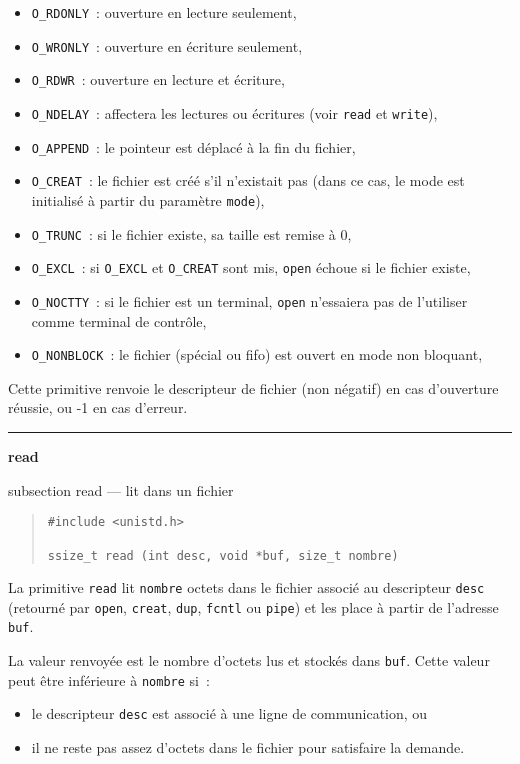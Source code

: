 \documentclass [twoside] {report}
\newcommand {\primitive} [1]
    {
	\phantomsection
	{\large \bf #1}
	\addcontentsline {toc} {subsection} {#1}
    }
\newcommand {\separation}
    {
	\vspace {5mm}
	\nopagebreak
	\hrule
    }
\begin{document}
\begin {itemize}
    \item {\tt O\_RDONLY}~: ouverture en lecture seulement,
    \item {\tt O\_WRONLY}~: ouverture en écriture seulement,
    \item {\tt O\_RDWR}~: ouverture en lecture et écriture,
    \item {\tt O\_NDELAY}~: affectera les lectures ou
	écritures (voir {\tt read} et {\tt write}),
    \item {\tt O\_APPEND}~: le pointeur est déplacé à la fin du fichier,
    \item {\tt O\_CREAT}~: le fichier est créé s'il n'existait pas
	(dans ce cas, le mode est initialisé à partir du paramètre {\tt mode}),
    \item {\tt O\_TRUNC}~: si le fichier existe, sa taille est remise à 0,
    \item {\tt O\_EXCL}~: si {\tt O\_EXCL} et {\tt O\_CREAT} sont mis,
	{\tt open} échoue si le fichier existe,
    \item {\tt O\_NOCTTY}~: si le fichier est un terminal, {\tt open}
	n'essaiera pas de l'utiliser comme terminal de contrôle,
    \item {\tt O\_NONBLOCK}~: le fichier (spécial ou fifo) est ouvert en
	mode non bloquant,
\end {itemize}

Cette primitive renvoie le descripteur de fichier
(non négatif) en cas d'ouverture
réussie, ou -1 en cas d'erreur.




\separation
\primitive {read} --- lit dans un fichier

\begin {quote}
\begin {verbatim}
#include <unistd.h>

ssize_t read (int desc, void *buf, size_t nombre)
\end{verbatim}
\end {quote}

La primitive {\tt read} lit {\tt nombre} octets dans
le fichier associé au descripteur {\tt desc}
(retourné par {\tt open}, {\tt creat}, {\tt dup}, {\tt fcntl}
ou {\tt pipe}) et les place à partir de l'adresse
{\tt buf}.

La valeur renvoyée est le nombre d'octets lus et
stockés dans {\tt buf}. Cette valeur peut être
inférieure à {\tt nombre} si~:
\begin {itemize}
    \item le descripteur {\tt desc} est associé à une ligne
	de communication, ou
    \item il ne reste pas assez d'octets dans le fichier
	pour satisfaire la demande.
\end {itemize}
\end{document}
